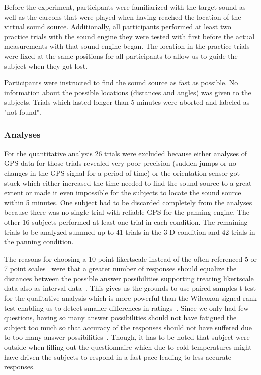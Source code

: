\documentclass[journal]{IEEEtran}
\begin{document}
Before the experiment, participants were familiarized with the target sound as well as the earcons that were played when having reached the location of the virtual sound source. Additionally, all participants performed at least two practice trials with the sound engine they were tested with first before the actual measurements with that sound engine began. The location in the practice trials were fixed at the same positions for all participants to allow us to guide the subject when they got lost. 

Participants were instructed to find the sound source as fast as possible. No information about the possible locations (distances and angles) was given to the subjects. Trials which lasted longer than 5 minutes were aborted and labeled as "not found". 

\subsubsection{Analyses}
For the quantitative analysis 26 trials were excluded because either analyses of GPS data for those trials revealed very poor precision (sudden jumps or no changes in the GPS signal for a period of time) or the orientation sensor got stuck which either increased the time needed to find the sound source to a great extent or made it even impossible for the subjects to locate the sound source within 5 minutes. One subject had to be discarded completely from the analyses because there was no single trial with reliable GPS for the panning engine. The other 16 subjects performed at least one trial in each condition. The remaining trials to be analyzed summed up to 41 trials in the 3-D condition and 42 trials in the panning condition.

The reasons for choosing a 10 point likertscale instead of the often referenced 5 or 7 point scales~\cite{} were that a greater number of responses should equalize the distances between the possible answer possibilities supporting treating likertscale data also as interval data~\cite{}. This gives us the grounds to use paired samples t-test for the qualitative analysis which is more powerful than the Wilcoxon signed rank test enabling us to detect smaller differences in ratings~\cite{}. Since we only had few questions, having so many answer possibilities should not have fatigued the subject too much so that accuracy of the responses should not have suffered due to too many answer possibilities~\cite{}. Though, it has to be noted that subject were outside when filling out the questionnaire which due to cold temperatures might have driven the subjects to respond in a fast pace leading to less accurate responses.
\end{document}
